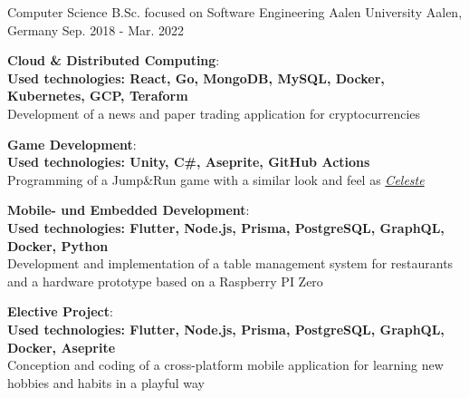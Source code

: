 

\begin{cventries}

  \cventry
    {Computer Science B.Sc. focused on Software Engineering} %
    {Aalen University} %
    {Aalen, Germany} %
    {Sep. 2018 - Mar. 2022} %
    {
      \begin{cvitems} %
        \item {\textbf{\faCloud{} Cloud \& Distributed Computing}: \\ 
         {\scriptsize\textbf{Used technologies: React, Go, MongoDB, MySQL, Docker, Kubernetes, GCP, Teraform}} \\
         Development of a news and paper trading application for cryptocurrencies}
        \item {\textbf{\faGamepad{} Game Development}: \\ 
         {\scriptsize\textbf{Used technologies: Unity, C\#, Aseprite, GitHub Actions}} \\
         Programming of a Jump\&Run game with a similar look and feel as \href{https://store.steampowered.com/app/504230/Celeste/}{\textit{Celeste}}}
        \item {\textbf{\faMobile{} Mobile- und Embedded Development}: \\
        {\scriptsize\textbf{Used technologies: Flutter, Node.js, Prisma, PostgreSQL, GraphQL, Docker, Python}} \\
        Development and implementation of a table management system for restaurants and a hardware prototype based on a Raspberry PI Zero}
        \item {\faHandSpockO{} \textbf{Elective Project}: \\
        {\scriptsize\textbf{Used technologies: Flutter, Node.js, Prisma, PostgreSQL, GraphQL, Docker, Aseprite}} \\
        Conception and coding of a cross-platform mobile application for learning new hobbies and habits in a playful way}
      \end{cvitems}
    }

\end{cventries}
